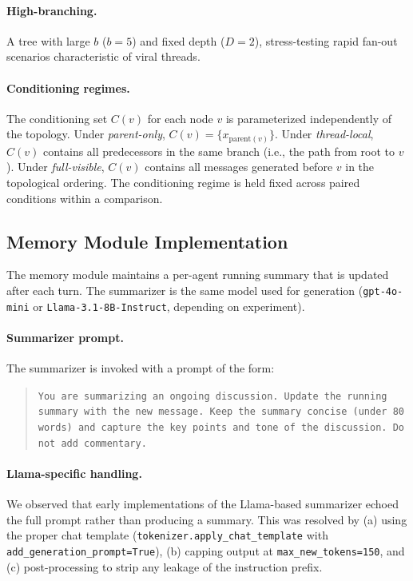 \paragraph{High-branching.}
A tree with large $b$ ($b{=}5$) and fixed depth ($D{=}2$), stress-testing rapid fan-out scenarios characteristic of viral threads.

\paragraph{Conditioning regimes.}
The conditioning set $C(v)$ for each node $v$ is parameterized independently of the topology.
Under \emph{parent-only}, $C(v) = \{x_{\mathrm{parent}(v)}\}$.
Under \emph{thread-local}, $C(v)$ contains all predecessors in the same branch (i.e., the path from root to $v$).
Under \emph{full-visible}, $C(v)$ contains all messages generated before $v$ in the topological ordering.
The conditioning regime is held fixed across paired conditions within a comparison.

\subsection{Memory Module Implementation}
\label{app:memory_module}

The memory module maintains a per-agent running summary that is updated after each turn.
The summarizer is the same model used for generation (\texttt{gpt-4o-mini} or \texttt{Llama-3.1-8B-Instruct}, depending on experiment).

\paragraph{Summarizer prompt.}
The summarizer is invoked with a prompt of the form:
\begin{quote}
\small
\texttt{You are summarizing an ongoing discussion. Update the running summary with the new message. Keep the summary concise (under 80 words) and capture the key points and tone of the discussion. Do not add commentary.}
\end{quote}

\paragraph{Llama-specific handling.}
We observed that early implementations of the Llama-based summarizer echoed the full prompt rather than producing a summary.
This was resolved by (a) using the proper chat template (\texttt{tokenizer.apply\_chat\_template} with \texttt{add\_generation\_prompt=True}), (b) capping output at \texttt{max\_new\_tokens=150}, and (c) post-processing to strip any leakage of the instruction prefix.

